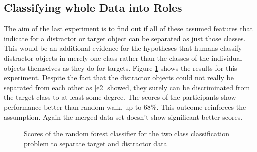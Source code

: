 \subsection{Classifying whole Data into Roles}
The aim of the last experiment is to find out if all of these assumed features that indicate for a distractor or target object can be separated as just those classes. This would be an additional evidence for the hypotheses that humans classify distractor objects in merely one class rather than the classes of the individual objects themselves as they do for targets. Figure \ref{tvd} shows the results for this experiment. Despite the fact that the distractor objects could not really be separated from each other as \ref{e2} showed, they surely can be discriminated from the target class to at least some degree. The scores of the participants show performance better than random walk, up to 68\%. This outcome reinforces the assumption. Again the merged data set doesn't show significant better scores.

\begin{figure}[H]
	\caption{Scores of the random forest classifier for the two class classification problem to separate target and distractor data}
	\label{tvd}
\end{figure}